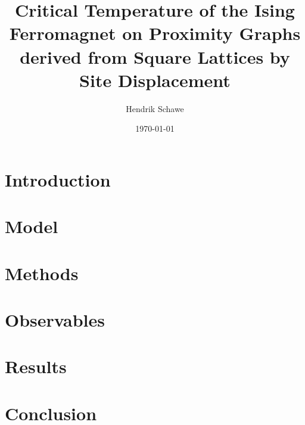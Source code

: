 \documentclass[prl,twocolumn,groupedaddress,showpacs,showkeys,amsmath,amssymb,floatfix]{revtex4-1}
\begin{document}
    \title{Critical Temperature of the Ising Ferromagnet on Proximity Graphs derived from Square Lattices by Site Displacement}
    \author{Hendrik Schawe}
    \date{\today}

    \begin{abstract}
    
    \end{abstract}

    \maketitle

    \section{Introduction}
        

    \section{Model}
        

    \section{Methods}
        

    \section{Observables}
        

    \section{Results}
        

    \section{Conclusion}
        

    

    
\end{document}
